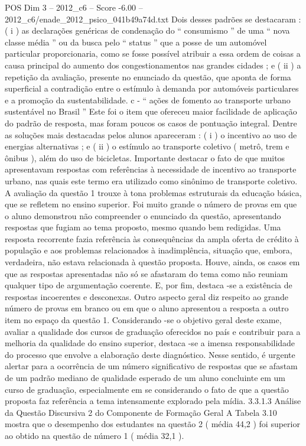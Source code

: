 \begin{textsample}{POS Dim 3 – 2012\_c6 – Score -6.00 – 2012\_c6/enade\_2012\_psico\_041b49a74d.txt}
Dois desses padrões se destacaram : ( i ) as declarações genéricas de condenação do “ consumismo ” de uma “ nova classe média ” ou da busca pelo “ status ” que a posse de um automóvel particular proporcionaria, como se fosse possível atribuir a essa ordem de coisas a causa principal do aumento dos congestionamentos nas grandes cidades ; e ( ii ) a repetição da avaliação, presente no enunciado da questão, que aponta de forma superficial a contradição entre o estímulo à demanda por automóveis particulares e a promoção da sustentabilidade. c - “ ações de fomento ao transporte urbano sustentável no Brasil ” Este foi o item que ofereceu maior facilidade de aplicação do padrão de resposta, mas foram poucos os casos de pontuação integral.
Dentre as soluções mais destacadas pelos alunos apareceram : ( i ) o incentivo ao uso de energias alternativas ; e ( ii ) o estímulo ao transporte coletivo ( metrô, trem e ônibus ), além do uso de bicicletas.
Importante destacar o fato de que muitos apresentavam respostas com referências à necessidade de incentivo ao transporte urbano, nas quais este termo era utilizado como sinônimo de transporte coletivo.
A avaliação da questão 1 trouxe à tona problemas estruturais da educação básica, que se refletem no ensino superior.
Foi muito grande o número de provas em que o aluno demonstrou não compreender o enunciado da questão, apresentando respostas que fugiam ao tema proposto, mesmo quando bem redigidas.
Uma resposta recorrente fazia referência às consequências da ampla oferta de crédito à população e aos problemas relacionados à inadimplência, situação que, embora, verdadeira, não estava relacionada à questão proposta.
Houve, ainda, os casos em que as respostas apresentadas não só se afastaram do tema como não reuniam qualquer tipo de argumentação coerente.
E, por fim, destaca -se a existência de respostas incoerentes e desconexas.
Outro aspecto geral diz respeito ao grande número de provas em branco ou em que o aluno apresentou a resposta a outro item no espaço da questão 1.
Considerando -se o objetivo geral deste exame, avaliar a qualidade dos cursos de graduação oferecidos no país e contribuir para a melhoria da qualidade do ensino superior, destaca -se a imensa responsabilidade do processo que envolve a elaboração deste diagnóstico.
Nesse sentido, é urgente alertar para a ocorrência de um número significativo de respostas que se afastam de um padrão mediano de qualidade esperado de um aluno concluinte em um curso de graduação, especialmente em se considerando o fato de que a questão proposta faz referência a tema intensamente explorado pela mídia. 3.3.1.3 Análise da Questão Discursiva 2 do Componente de Formação Geral A Tabela 3.10 mostra que o desempenho dos estudantes na questão 2 ( média 44,2 ) foi superior ao obtido na questão de número 1 ( média 32,1 ).

\end{textsample}
